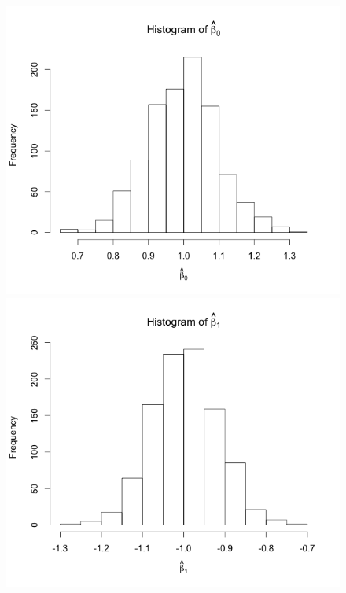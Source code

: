 \documentclass[11pt]{article}
\begin{document}
\begin{enumerate}
\begin{enumerate}
\begin{figure}[H]
				\includegraphics[scale=0.4]{Rplot1c1}
				\includegraphics[scale=0.4]{Rplot1c2}

\end{figure}
\end{enumerate}
\end{enumerate}
\end{document}
